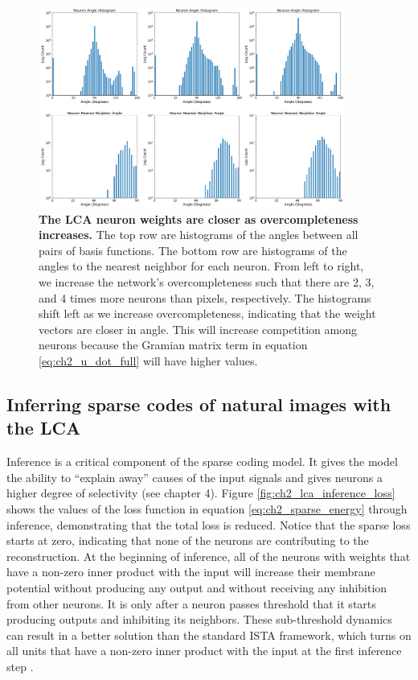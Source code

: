 \begin{figure}[h]
    \centering
    \includegraphics[width=0.9\textwidth]{figures/lca_angle_hists.png}
    \caption{\textbf{The LCA neuron weights are closer as overcompleteness increases.} The top row are histograms of the angles between all pairs of basis functions. The bottom row are histograms of the angles to the nearest neighbor for each neuron. From left to right, we increase the network's overcompleteness such that there are 2, 3, and 4 times more neurons than pixels, respectively. The histograms shift left as we increase overcompleteness, indicating that the weight vectors are closer in angle. This will increase competition among neurons because the Gramian matrix term in equation \eqref{eq:ch2_u_dot_full} will have higher values.}
    \label{fig:ch2_lca_angle_histograms}
\end{figure}


\subsection{Inferring sparse codes of natural images with the LCA}
Inference is a critical component of the sparse coding model.
It gives the model the ability to ``explain away'' causes of the input signals \parencite{olshausen1997sparse} and gives neurons a higher degree of selectivity (see chapter 4). %
Figure \ref{fig:ch2_lca_inference_loss} shows the values of the loss function in equation \eqref{eq:ch2_sparse_energy} through inference, demonstrating that the total loss is reduced.
Notice that the sparse loss starts at zero, indicating that none of the neurons are contributing to the reconstruction.
At the beginning of inference, all of the neurons with weights that have a non-zero inner product with the input will increase their membrane potential without producing any output and without receiving any inhibition from other neurons.
It is only after a neuron passes threshold that it starts producing outputs and inhibiting its neighbors.
These sub-threshold dynamics can result in a better solution than the standard ISTA framework, which turns on all units that have a non-zero inner product with the input at the first inference step \parencite{rozell2008sparse}.

